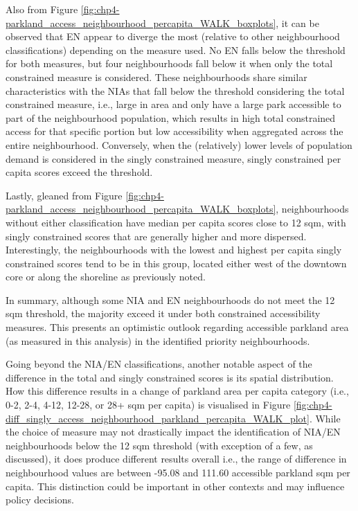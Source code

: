 \documentclass[
11pt, %
oneside, %
english, %
singlespacing, %
]{macthesis} %
\begin{document}
Also from Figure \ref{fig:chp4-parkland_access_neighbourhood_percapita_WALK_boxplots}, it can be observed that EN appear to diverge the most (relative to other neighbourhood classifications) depending on the measure used. No EN falls below the threshold for both measures, but four neighbourhoods fall below it when only the total constrained measure is considered. These neighbourhoods share similar characteristics with the NIAs that fall below the threshold considering the total constrained measure, i.e., large in area and only have a large park accessible to part of the neighbourhood population, which results in high total constrained access for that specific portion but low accessibility when aggregated across the entire neighbourhood. Conversely, when the (relatively) lower levels of population demand is considered in the singly constrained measure, singly constrained per capita scores exceed the threshold.

Lastly, gleaned from Figure \ref{fig:chp4-parkland_access_neighbourhood_percapita_WALK_boxplots}, neighbourhoods without either classification have median per capita scores close to 12 sqm, with singly constrained scores that are generally higher and more dispersed. Interestingly, the neighbourhoods with the lowest and highest per capita singly constrained scores tend to be in this group, located either west of the downtown core or along the shoreline as previously noted.

In summary, although some NIA and EN neighbourhoods do not meet the 12 sqm threshold, the majority exceed it under both constrained accessibility measures. This presents an optimistic outlook regarding accessible parkland area (as measured in this analysis) in the identified priority neighbourhoods.

Going beyond the NIA/EN classifications, another notable aspect of the difference in the total and singly constrained scores is its spatial distribution. How this difference results in a change of parkland area per capita category (i.e., 0-2, 2-4, 4-12, 12-28, or 28+ sqm per capita) is visualised in Figure \ref{fig:chp4-diff_singly_access_neighbourhood_parkland_percapita_WALK_plot}. While the choice of measure may not drastically impact the identification of NIA/EN neighbourhoods below the 12 sqm threshold (with exception of a few, as discussed), it does produce different results overall i.e., the range of difference in neighbourhood values are between -95.08 and 111.60 accessible parkland sqm per capita. This distinction could be important in other contexts and may influence policy decisions.
\end{document}
